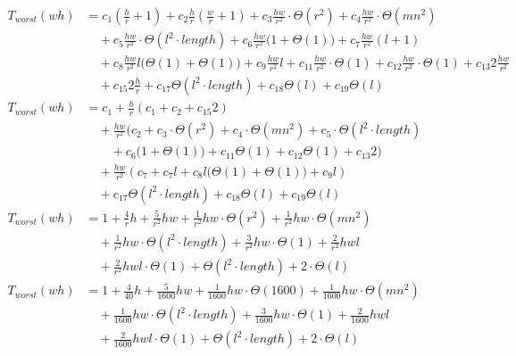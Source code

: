 \begin{subequations}
\label{eq:linedetection-hirzer-extending}
\begin{align}
\label{eq:linedetection-hirzer-extending-1}
T_{worst}(wh)& =
c_{1}(\frac{h}{r} + 1)
+ c_{2}\frac{h}{r}(\frac{w}{r} + 1)
+ c_{3}\frac{hw}{r^2}\cdot\Theta(r^2)
+ c_{4}\frac{hw}{r^2}\cdot\Theta(mn^2)
\\
& \quad
+ c_{5}\frac{hw}{r^2}\cdot\Theta(l^2\cdot\mathit{length})
+ c_{6}\frac{hw}{r^2}\bigl(1 + \Theta(1)\bigr)
+ c_{7}\frac{hw}{r^2}(l + 1)
\nonumber \\
& \quad
+ c_{8}\frac{hw}{r^2}l\bigl(\Theta(1) + \Theta(1)\bigr)
+ c_{9}\frac{hw}{r^2}l
+ c_{11}\frac{hw}{r^2}\cdot\Theta(1)
+ c_{12}\frac{hw}{r^2}\cdot\Theta(1)
+ c_{13}2\frac{hw}{r^2}
\nonumber \\
& \quad
+ c_{15}2\frac{h}{r}
+ c_{17}\Theta(l^2\cdot\mathit{length})
+ c_{18}\Theta(l)
+ c_{19}\Theta(l)
\nonumber \\
\label{eq:linedetection-hirzer-extending-2}
T_{worst}(wh)& =
c_{1} + \frac{h}{r}(c_{1} + c_{2} + c_{15}2)
\\
& \quad
+ \frac{hw}{r^2}(c_{2} + c_{3}\cdot\Theta(r^2) + c_{4}\cdot\Theta(mn^2) + c_{5}\cdot\Theta(l^2\cdot\mathit{length})
\nonumber \\
& \quad \quad + c_{6}\bigl(1 + \Theta(1)\bigr) + c_{11}\Theta(1) + c_{12}\Theta(1) + c_{13}2)
\nonumber \\
& \quad
+ \frac{hw}{r^2}(c_{7} + c_{7}l + c_{8}l\bigl(\Theta(1) + \Theta(1)\bigr) + c_{9}l)
\nonumber \\
& \quad
+ c_{17}\Theta(l^2\cdot\mathit{length}) + c_{18}\Theta(l) + c_{19}\Theta(l)
\nonumber \\
\label{eq:linedetection-hirzer-extending-3}
T_{worst}(wh)& =
1
+ \frac{4}{r}h
+ \frac{5}{r^2}hw
+ \frac{1}{r^2}hw\cdot\Theta(r^2)
+ \frac{1}{r^2}hw\cdot\Theta(mn^2)
\\
& \quad
+ \frac{1}{r^2}hw\cdot\Theta(l^2\cdot\mathit{length})
+ \frac{3}{r^2}hw\cdot\Theta(1)
+ \frac{2}{r^2}hwl
\nonumber \\
& \quad
+ \frac{2}{r^2}hwl\cdot\Theta(1)
+ \Theta(l^2\cdot\mathit{length})
+ 2\cdot\Theta(l)
\nonumber \\
\label{eq:linedetection-hirzer-extending-4}
T_{worst}(wh)& =
1
+ \frac{4}{40}h
+ \frac{5}{1600}hw
+ \frac{1}{1600}hw\cdot\Theta(1600)
+ \frac{1}{1600}hw\cdot\Theta(mn^2)
\\
& \quad
+ \frac{1}{1600}hw\cdot\Theta(l^2\cdot\mathit{length})
+ \frac{3}{1600}hw\cdot\Theta(1)
+ \frac{2}{1600}hwl
\nonumber \\
& \quad
+ \frac{2}{1600}hwl\cdot\Theta(1)
+ \Theta(l^2\cdot\mathit{length})
+ 2\cdot\Theta(l)
\nonumber
\end{align}
\end{subequations}
